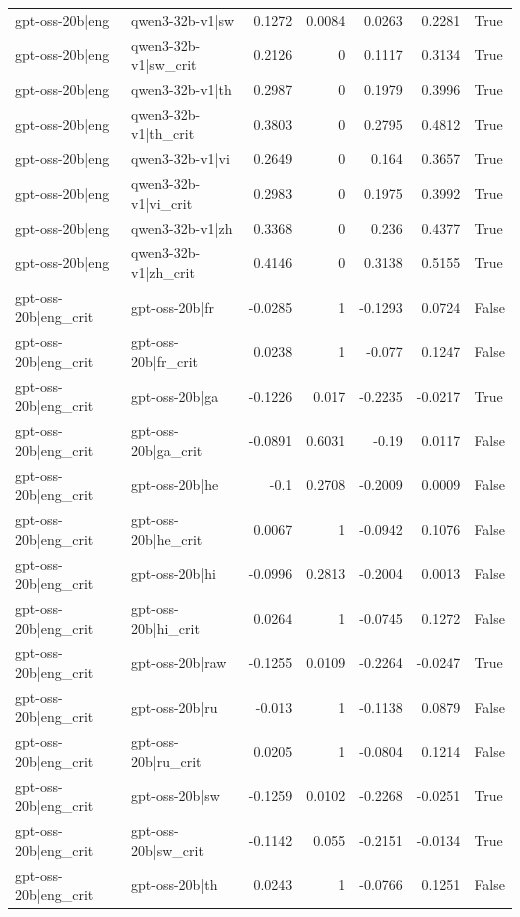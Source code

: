 \begin{table}
\begin{tabular}{l l r r r r l}
gpt-oss-20b|eng & qwen3-32b-v1|sw & 0.1272 & 0.0084 & 0.0263 & 0.2281 & True \\
gpt-oss-20b|eng & qwen3-32b-v1|sw_crit & 0.2126 & 0 & 0.1117 & 0.3134 & True \\
gpt-oss-20b|eng & qwen3-32b-v1|th & 0.2987 & 0 & 0.1979 & 0.3996 & True \\
gpt-oss-20b|eng & qwen3-32b-v1|th_crit & 0.3803 & 0 & 0.2795 & 0.4812 & True \\
gpt-oss-20b|eng & qwen3-32b-v1|vi & 0.2649 & 0 & 0.164 & 0.3657 & True \\
gpt-oss-20b|eng & qwen3-32b-v1|vi_crit & 0.2983 & 0 & 0.1975 & 0.3992 & True \\
gpt-oss-20b|eng & qwen3-32b-v1|zh & 0.3368 & 0 & 0.236 & 0.4377 & True \\
gpt-oss-20b|eng & qwen3-32b-v1|zh_crit & 0.4146 & 0 & 0.3138 & 0.5155 & True \\
gpt-oss-20b|eng_crit & gpt-oss-20b|fr & -0.0285 & 1 & -0.1293 & 0.0724 & False \\
gpt-oss-20b|eng_crit & gpt-oss-20b|fr_crit & 0.0238 & 1 & -0.077 & 0.1247 & False \\
gpt-oss-20b|eng_crit & gpt-oss-20b|ga & -0.1226 & 0.017 & -0.2235 & -0.0217 & True \\
gpt-oss-20b|eng_crit & gpt-oss-20b|ga_crit & -0.0891 & 0.6031 & -0.19 & 0.0117 & False \\
gpt-oss-20b|eng_crit & gpt-oss-20b|he & -0.1 & 0.2708 & -0.2009 & 0.0009 & False \\
gpt-oss-20b|eng_crit & gpt-oss-20b|he_crit & 0.0067 & 1 & -0.0942 & 0.1076 & False \\
gpt-oss-20b|eng_crit & gpt-oss-20b|hi & -0.0996 & 0.2813 & -0.2004 & 0.0013 & False \\
gpt-oss-20b|eng_crit & gpt-oss-20b|hi_crit & 0.0264 & 1 & -0.0745 & 0.1272 & False \\
gpt-oss-20b|eng_crit & gpt-oss-20b|raw & -0.1255 & 0.0109 & -0.2264 & -0.0247 & True \\
gpt-oss-20b|eng_crit & gpt-oss-20b|ru & -0.013 & 1 & -0.1138 & 0.0879 & False \\
gpt-oss-20b|eng_crit & gpt-oss-20b|ru_crit & 0.0205 & 1 & -0.0804 & 0.1214 & False \\
gpt-oss-20b|eng_crit & gpt-oss-20b|sw & -0.1259 & 0.0102 & -0.2268 & -0.0251 & True \\
gpt-oss-20b|eng_crit & gpt-oss-20b|sw_crit & -0.1142 & 0.055 & -0.2151 & -0.0134 & True \\
gpt-oss-20b|eng_crit & gpt-oss-20b|th & 0.0243 & 1 & -0.0766 & 0.1251 & False \\

\end{tabular}
\end{table}
